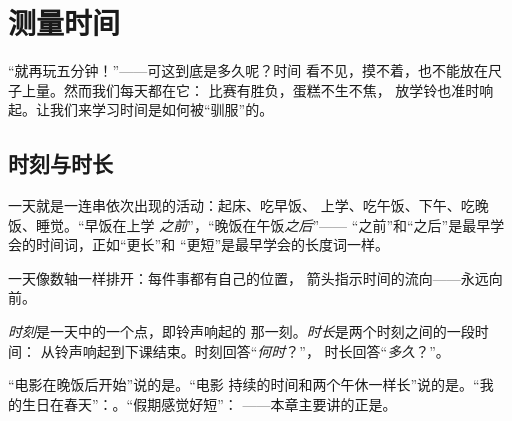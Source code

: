 \chapter{测量时间}\label{ch:g2:measuring-time}

“就再玩五分钟！”——可这到底是多久呢？时间
看不见，摸不着，也不能放在尺子上量。然而我们每天都在它：
比赛有胜负，蛋糕不生不焦，
放学铃也准时响起。让我们来学习时间是如何被“驯服”的。

\section{时刻与时长}

\begin{example}[一天的顺序]\label{ex:g2:measuring-time:order}
一天就是一连串依次出现的活动：起床、吃早饭、
上学、吃午饭、下午、吃晚饭、睡觉。“早饭在上学
\emph{之前}”，“晚饭在午饭\emph{之后}”——
“之前”和“之后”是最早学会的时间词，正如“更长”和
“更短”是最早学会的长度词一样。
\end{example}

\begin{omfigure}

{\small 一天像数轴一样排开：每件事都有自己的位置，
箭头指示时间的流向——永远向前。}
\end{omfigure}

\begin{definition}[时长]\label{def:g2:measuring-time:duration}
\emph{时刻}是一天中的一个点，即铃声响起的
那一刻。\emph{时长}是两个时刻之间的一段时间：
从铃声响起到下课结束。时刻回答“\emph{何时}？”，
时长回答“\emph{多久}？”。
\end{definition}

\begin{example}[何时还是多久？]\label{ex:g2:measuring-time:whenhowlong}
“电影在晚饭后开始”说的是。“电影
持续的时间和两个午休一样长”说的是。“我
的生日在春天”：。“假期感觉好短”：
——本章主要讲的正是。
\end{example}

